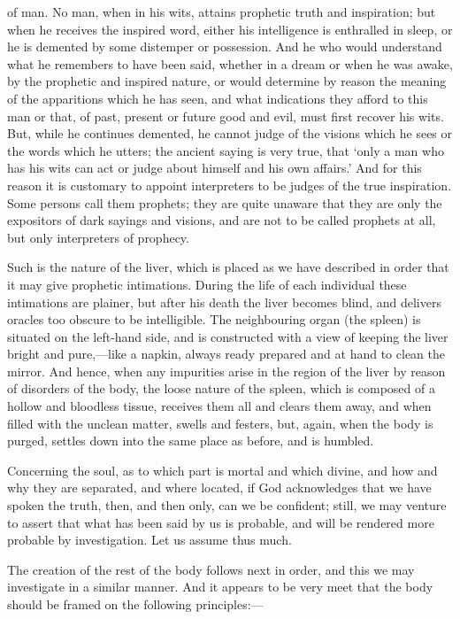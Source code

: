 of man. No man, when in his wits, attains prophetic truth and inspiration;
but when he receives the inspired word, either his intelligence is
enthralled in sleep, or he is demented by some distemper or possession.
And he who would understand what he remembers to have been said, whether
in a dream or when he was awake, by the prophetic and inspired nature, or
would determine by reason the meaning of the apparitions which he has
seen, and what indications they afford to this man or that, of past,
present or future good and evil, must first recover his wits. But, while
he continues demented, he cannot judge of the visions which he sees or the
words which he utters; the ancient saying is very true, that ‘only a man
who has his wits can act or judge about himself and his own affairs.’ And
for this reason it is customary to appoint interpreters to be judges of
the true inspiration. Some persons call them prophets; they are quite
unaware that they are only the expositors of dark sayings and visions, and
are not to be called prophets at all, but only interpreters of prophecy.

Such is the nature of the liver, which is placed as we have described in
order that it may give prophetic intimations. During the life of each
individual these intimations are plainer, but after his death the liver
becomes blind, and delivers oracles too obscure to be intelligible. The
neighbouring organ (the spleen) is situated on the left-hand side, and is
constructed with a view of keeping the liver bright and pure,—like a
napkin, always ready prepared and at hand to clean the mirror. And hence,
when any impurities arise in the region of the liver by reason of
disorders of the body, the loose nature of the spleen, which is composed
of a hollow and bloodless tissue, receives them all and clears them away,
and when filled with the unclean matter, swells and festers, but, again,
when the body is purged, settles down into the same place as before, and
is humbled.

Concerning the soul, as to which part is mortal and which divine, and how
and why they are separated, and where located, if God acknowledges that we
have spoken the truth, then, and then only, can we be confident; still, we
may venture to assert that what has been said by us is probable, and will
be rendered more probable by investigation. Let us assume thus much.

The creation of the rest of the body follows next in order, and this we
may investigate in a similar manner. And it appears to be very meet that
the body should be framed on the following principles:—

